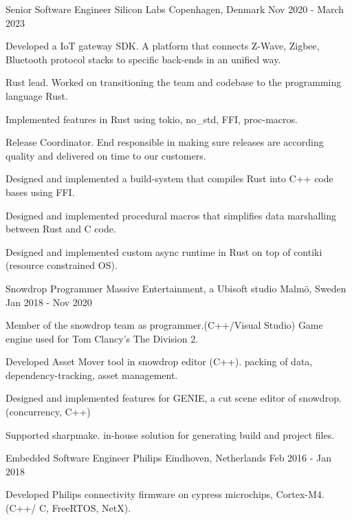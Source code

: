 \begin{cventries}
  \cventry
    {Senior Software Engineer}
    {Silicon Labs}
    {Copenhagen, Denmark}
    {Nov 2020 - March 2023}
    {
      \begin{cvitems}
		\item {Developed a IoT gateway SDK. A platform that connects Z-Wave, Zigbee, Bluetooth protocol stacks to specific back-ends in an unified way.}
		\item {Rust lead. Worked on transitioning the team and codebase to the programming language Rust.}
        \item {Implemented features in Rust using tokio, no_std, FFI, proc-macros.}
		\item {Release Coordinator. End responsible in making sure releases are according quality and delivered on time to our customers.}
        \item {Designed and implemented a build-system that compiles Rust into C++ code bases using FFI.}
		\item {Designed and implemented procedural macros that simplifies data marshalling between Rust and C code.}
		\item {Designed and implemented custom async runtime in Rust on top of contiki (resource constrained OS). }
      \end{cvitems}
    }
  \cventry
    {Snowdrop Programmer}
    {Massive Entertainment, a Ubisoft studio}
    {Malmö, Sweden}
    {Jan 2018 - Nov 2020}
    {
      \begin{cvitems}
		\item { Member of the snowdrop team as programmer.(C++/Visual Studio) Game engine used for Tom Clancy's The Division 2. }
        \item { Developed Asset Mover tool in snowdrop editor (C++). packing of data, dependency-tracking, asset management.}
        \item { Designed and implemented features for GENIE, a cut scene editor of snowdrop. (concurrency, C++) }
        \item { Supported sharpmake. in-house solution for generating build and
            project files. }
      \end{cvitems}
    }
  \cventry
    {Embedded Software Engineer}
    {Philips}
    {Eindhoven, Netherlands}
    {Feb 2016 - Jan 2018}
    {
      \begin{cvitems}
        \item {Developed Philips connectivity firmware on cypress microchips, Cortex-M4.(C++/ C, FreeRTOS, NetX).}

\end{cvitems}}
\end{cventries}
